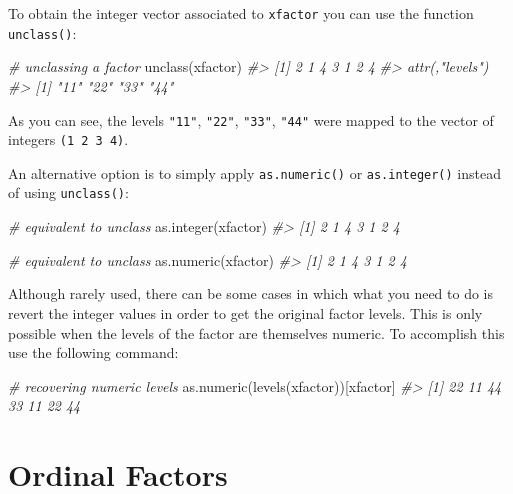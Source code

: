 \documentclass[
]{book}
\newenvironment{Shaded}{\begin{snugshade}}{\end{snugshade}}
\newcommand{\CommentTok}[1]{\textcolor[rgb]{0.56,0.35,0.01}{\textit{#1}}}
\newcommand{\FunctionTok}[1]{\textcolor[rgb]{0.00,0.00,0.00}{#1}}
\newcommand{\NormalTok}[1]{#1}
\begin{document}
To obtain the integer vector associated to \texttt{xfactor} you can use the function
\texttt{unclass()}:

\begin{Shaded}
\begin{Highlighting}[]
\CommentTok{\# unclassing a factor}
\FunctionTok{unclass}\NormalTok{(xfactor)}
\CommentTok{\#\textgreater{} [1] 2 1 4 3 1 2 4}
\CommentTok{\#\textgreater{} attr(,"levels")}
\CommentTok{\#\textgreater{} [1] "11" "22" "33" "44"}
\end{Highlighting}
\end{Shaded}

As you can see, the levels \texttt{"11"}, \texttt{"22"}, \texttt{"33"}, \texttt{"44"} were mapped to the
vector of integers \texttt{(1\ 2\ 3\ 4)}.

An alternative option is to simply apply \texttt{as.numeric()} or \texttt{as.integer()}
instead of using \texttt{unclass()}:

\begin{Shaded}
\begin{Highlighting}[]
\CommentTok{\# equivalent to unclass}
\FunctionTok{as.integer}\NormalTok{(xfactor)}
\CommentTok{\#\textgreater{} [1] 2 1 4 3 1 2 4}

\CommentTok{\# equivalent to unclass}
\FunctionTok{as.numeric}\NormalTok{(xfactor)}
\CommentTok{\#\textgreater{} [1] 2 1 4 3 1 2 4}
\end{Highlighting}
\end{Shaded}

Although rarely used, there can be some cases in which what you need to do is
revert the integer values in order to get the original factor levels. This is
only possible when the levels of the factor are themselves numeric. To accomplish
this use the following command:

\begin{Shaded}
\begin{Highlighting}[]
\CommentTok{\# recovering numeric levels}
\FunctionTok{as.numeric}\NormalTok{(}\FunctionTok{levels}\NormalTok{(xfactor))[xfactor]}
\CommentTok{\#\textgreater{} [1] 22 11 44 33 11 22 44}
\end{Highlighting}
\end{Shaded}

\hypertarget{ordinal-factors}{%
\section{Ordinal Factors}\label{ordinal-factors}}
\end{document}
